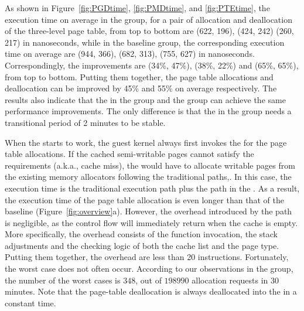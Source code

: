 As shown in Figure~\ref{fig:PGDtime}, \ref{fig:PMDtime}, and \ref{fig:PTEtime}, the execution time on average in the \prename group, for a pair of allocation and deallocation of the three-level page table, from top to bottom are (622, 196), (424, 242) (260, 217) in nanoseconds, while in the baseline group, the corresponding execution time on average are (944, 366), (682, 313), (755, 627) in nanoseconds. Correspondingly, the improvements are (34\%, 47\%), (38\%, 22\%) and (65\%, 65\%), from top to bottom.
Putting them together, the page table allocations and deallocation can be improved by 45\% and 55\% on average respectively.
The results also indicate that the \name in the \dynname group and the \prename group can achieve the same performance improvements.
The only difference is that the \name in the \dynname group needs a transitional period of 2 minutes to be stable.

When the \name starts to work, the guest kernel always first invokes the \cache for the page table allocations.
If the cached semi-writable pages cannot satisfy the requirements (a.k.a., cache miss), the \cache would have to allocate writable pages from the existing memory allocators following the traditional paths,.
In this case, the execution time is the traditional execution path plus the path in the \cache.
As a result, the execution time of the page table allocation is even longer than that of the baseline (Figure~\ref{fig:overview}a).
However, the overhead introduced by the \name path is negligible, as the control flow will immediately return when the cache is empty.
More specifically, the overhead consists of the function invocation, the stack adjustments and the checking logic of both the cache list and the page type.
Putting them together, the overhead are less than 20 instructions.
Fortunately, the worst case does not often occur. According to our observations in the \dynname group, the number of the worst cases is $348$, out of $198990$ allocation requests in 30 minutes.
Note that the page-table deallocation is always deallocated into the \cache in a constant time.



